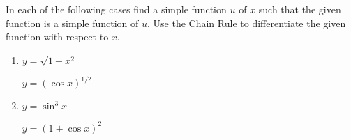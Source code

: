In each of the following cases find a simple function $u$ of $x$ such that the given function is a simple function of $u$.  
Use the Chain Rule to differentiate the given function with respect to $x$.   

\begin{enumerate}
\item   $y = \sqrt{1+x^2}$


  $y = (\cos x)^{1/2}$
%

\item   $y = \sin^3 x$

  $y = (1+\cos x)^2$
%

\end{enumerate}
